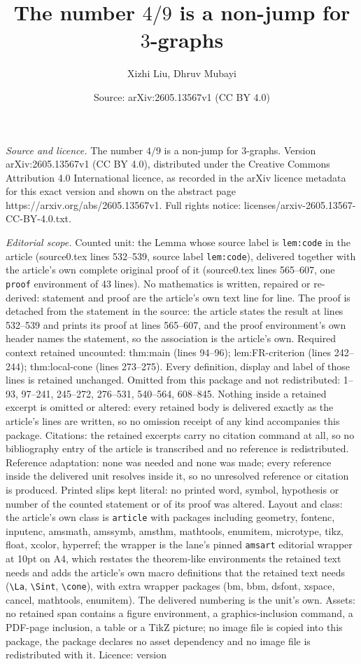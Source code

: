 \documentclass[10pt,a4paper]{amsart}
\title[The number $4/9$ is a non-jump for $3$-graphs]{The number $4/9$ is a non-jump for $3$-graphs}
\author{Xizhi Liu, Dhruv Mubayi}
\date{Source: arXiv:2605.13567v1 (CC BY 4.0)}
\begin{document}
\maketitle

\noindent\emph{Source and licence.} The number $4/9$ is a non-jump for $3$-graphs. Version arXiv:2605.13567v1 (CC BY 4.0), distributed under the Creative Commons Attribution 4.0 International licence, as recorded in the arXiv licence metadata for this exact version and shown on the abstract page https://arxiv.org/abs/2605.13567v1. Full rights notice: licenses/arxiv-2605.13567-CC-BY-4.0.txt.\par\smallskip

\noindent\textit{Editorial scope.} Counted unit: the Lemma whose source label is \texttt{lem:code} in the article (source0.tex lines 532--539, source label \texttt{lem:code}), delivered together with the article's own complete original proof of it (source0.tex lines 565--607, one \texttt{proof} environment of 43 lines). No mathematics is written, repaired or re-derived: statement and proof are the article's own text line for line. The proof is detached from the statement in the source: the article states the result at lines 532--539 and prints its proof at lines 565--607, and the proof environment's own header names the statement, so the association is the article's own. Required context retained uncounted: thm:main (lines 94--96); lem:FR-criterion (lines 242--244); thm:local-cone (lines 273--275). Every definition, display and label of those lines is retained unchanged. Omitted from this package and not redistributed: 1--93, 97--241, 245--272, 276--531, 540--564, 608--845. Nothing inside a retained excerpt is omitted or altered: every retained body is delivered exactly as the article's lines are written, so no omission receipt of any kind accompanies this package. Citations: the retained excerpts carry no citation command at all, so no bibliography entry of the article is transcribed and no reference is redistributed. Reference adaptation: none was needed and none was made; every reference inside the delivered unit resolves inside it, so no unresolved reference or citation is produced. Printed slips kept literal: no printed word, symbol, hypothesis or number of the counted statement or of its proof was altered. Layout and class: the article's own class is \texttt{article} with packages including geometry, fontenc, inputenc, amsmath, amssymb, amsthm, mathtools, enumitem, microtype, tikz, float, xcolor, hyperref; the wrapper is the lane's pinned \texttt{amsart} editorial wrapper at 10pt on A4, which restates the theorem-like environments the retained text needs and adds the article's own macro definitions that the retained text needs (\texttt{\textbackslash La}, \texttt{\textbackslash Sint}, \texttt{\textbackslash cone}), with extra wrapper packages (bm, bbm, dsfont, xspace, cancel, mathtools, enumitem). The delivered numbering is the unit's own. Assets: no retained span contains a figure environment, a graphics-inclusion command, a PDF-page inclusion, a table or a TikZ picture; no image file is copied into this package, the package declares no asset dependency and no image file is redistributed with it. Licence: version 
\end{document}
